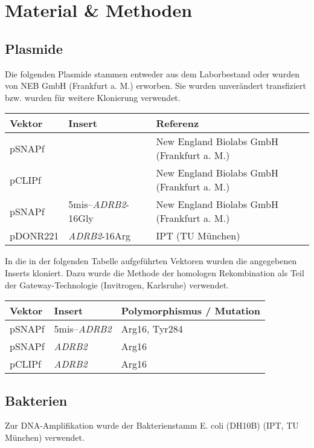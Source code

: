 \chapter{Material \& Methoden}\label{chapter:materialmethoden}

\section{Plasmide}
Die folgenden Plasmide stammen entweder aus dem Laborbestand oder wurden von NEB GmbH (Frankfurt a. M.) erworben. Sie wurden unverändert transfiziert bzw. wurden für weitere Klonierung verwendet.

\begin{table}[htsb]
    \begin{tabular}{lll}
        \toprule
        Vektor		&	Insert		& 	Referenz	\\
        \midrule
        pSNAPf		&				&	New England Biolabs GmbH (Frankfurt a. M.)\\
        pCLIPf		&				&	New England Biolabs GmbH (Frankfurt a. M.)\\
        pSNAPf		&	5mis--\textit{ADRB2}-16Gly	&	New England Biolabs GmbH (Frankfurt a. M.)\\
        pDONR221	&	\textit{ADRB2}-16Arg	    &	IPT (TU München)\\
    \bottomrule
    \end{tabular}
\end{table}

In die in der folgenden Tabelle aufgeführten Vektoren wurden die angegebenen Inserts kloniert. Dazu wurde die Methode der homologen Rekombination als Teil der Gateway-Technologie (Invitrogen, Karlsruhe) verwendet.

\begin{table}[htsb]
\begin{tabularx}{\textwidth}{lll}
\toprule
Vektor		&	Insert		&	Polymorphismus / Mutation\\
\midrule
pSNAPf		&	5mis--\textit{ADRB2}	&	Arg16, Tyr284\\
pSNAPf		&	\textit{ADRB2}		&	Arg16\\
pCLIPf		&	\textit{ADRB2}		&	Arg16\\
\bottomrule
\end{tabularx}
\end{table}

\section{Bakterien}
Zur DNA-Amplifikation wurde der Bakterienstamm E. coli (DH10B) (IPT, TU München) verwendet.

